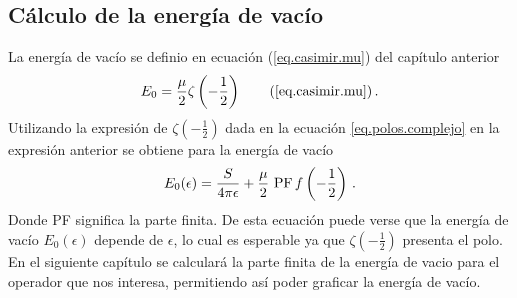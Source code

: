 \subsection{Cálculo de la energía de vacío} 

La energía de vacío se definio en ecuación (\ref{eq.casimir.mu}) del capítulo anterior
\begin{equation*}
    E _0 = \frac{\mu }{2}  
    \zeta  \left( - \frac{1}{2} \right) 
    \tag{\ref{eq.casimir.mu}} \, .
\end{equation*}
Utilizando la expresión de $\zeta \left( - \frac{1}{2} \right)$ dada en la ecuación \eqref{eq.polos.complejo} en  la expresión anterior se obtiene para la energía de vacío
\begin{equation}
E _0 ( \epsilon )
				= 
				\frac{S}{4 \pi \epsilon }
				+ 
				\frac{\mu}{2} \ {\rm PF} \, f \left( - \frac{1}{2} \right)
\, .
\end{equation}
Donde PF significa la parte finita. De esta ecuación puede verse que la energía de vacío $E _0 (\epsilon)$ depende de $\epsilon$, lo cual es esperable ya que $\zeta \left( -\frac{1}{2} \right)$ presenta el polo. 
En el siguiente capítulo se calculará la parte finita de la energía de vacio para el operador que nos interesa, permitiendo así poder graficar la energía de vacío.
